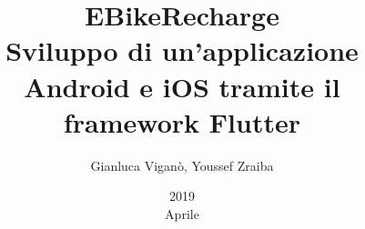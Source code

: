 \documentclass[12pt,a4paper]{article}
\title{
	EBikeRecharge  \\ \large Sviluppo di un'applicazione   \\
	Android e iOS tramite il framework Flutter}
\date{2019 \\ Aprile}
\author{Gianluca Viganò, Youssef Zraiba}
\numberwithin{figure}{section}
\begin{document}
	\maketitle
	\newpage
	\tableofcontents
	\newpage

	\begin{spacing}{1.5}
	
	\newpage
	
	\newpage
	
	\newpage
	
	\newpage
	
	
\end{spacing}

	
	
	
	\newpage
	
\end{document}
